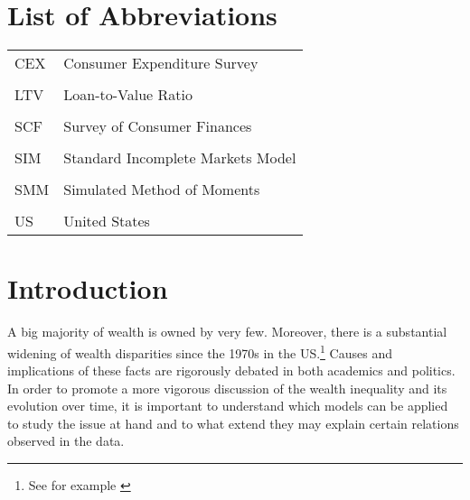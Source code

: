\documentclass[a4paper,12pt,legno]{article}
\begin{document}
 \newpage
\thispagestyle{empty}
\listoffigures

 \newpage
 
	\thispagestyle{empty}
	\section*{List of Abbreviations}
	
	\begin{table}[!htbp]
		\centering
	\begin{flushleft}  
	   \begin{tabular}{ll}
	    CEX	  & Consumer Expenditure Survey \\ \\
	    LTV   & Loan-to-Value Ratio \\ \\
	    SCF	  & Survey of Consumer Finances \\ \\
	    SIM   & Standard Incomplete Markets Model \\ \\
	    SMM   & Simulated Method of Moments \\ \\
	    US	  & United States
	    \end{tabular}%
	\end{flushleft}
	\end{table}%
	\newpage



\setcounter{page}{1}        %


\section{Introduction}
\label{Introduction}

A big majority of wealth is owned by very few. Moreover, there is a substantial widening of wealth disparities since the 1970s in the US.\footnote{See for example \citet{kuhn2017income}} Causes and implications of these facts are rigorously debated in both academics and politics. In order to promote a more vigorous discussion of the wealth inequality and its evolution over time, it is important to understand which models can be applied to study the issue at hand and to what extend they may explain certain relations observed in the data.\\
\end{document}

